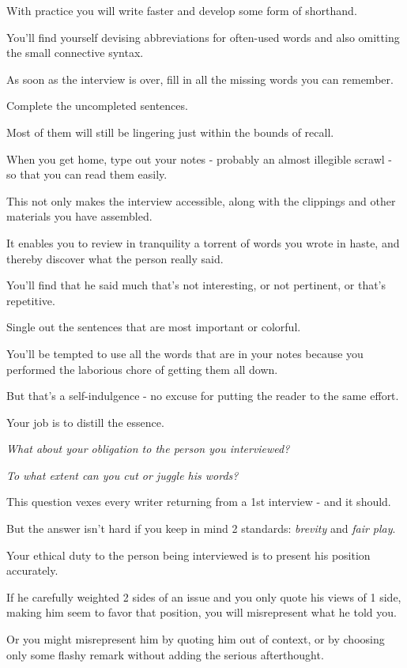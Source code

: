 \documentclass{book}
\numberwithin{equation}{section}
\begin{document}
%
With practice you will write faster and develop some form of shorthand.

You'll find yourself devising abbreviations for often-used words and also omitting the small connective syntax.

As soon as the interview is over, fill in all the missing words you can remember.

Complete the uncompleted sentences.

Most of them will still be lingering just within the bounds of recall.

When you get home, type out your notes - probably an almost illegible scrawl - so that you can read them easily.

This not only makes the interview accessible, along with the clippings and other materials you have assembled.

It enables you to review in tranquility a torrent of words you wrote in haste, and thereby discover what the person really said.

%
You'll find that he said much that's not interesting, or not pertinent, or that's repetitive.

Single out the sentences that are most important or colorful.

You'll be tempted to use all the words that are in your notes because you performed the laborious chore of getting them all down.

But that's a self-indulgence - no excuse for putting the reader to the same effort.

Your job is to distill the essence.

%
\textit{What about your obligation to the person you interviewed?}

\textit{To what extent can you cut or juggle his words?}

This question vexes every writer returning from a 1st interview - and it should.

But the answer isn't hard if you keep in mind 2 standards: \textit{brevity} and \textit{fair play}.

%
Your ethical duty to the person being interviewed is to present his position accurately.

If he carefully weighted 2 sides of an issue and you only quote his views of 1 side, making him seem to favor that position, you will misrepresent what he told you.

Or you might misrepresent him by quoting him out of context, or by choosing only some flashy remark without adding the serious afterthought.
\end{document}
